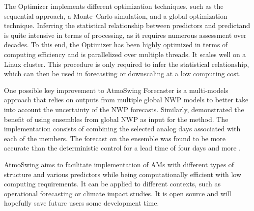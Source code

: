 \documentclass[gmdd]{copernicus}
\begin{document}
The Optimizer implements different optimization techniques, such as the sequential approach, a Monte--Carlo simulation, and a global optimization technique. Inferring the statistical relationship between predictors and predictand is quite intensive in terms of processing, as it requires numerous assessment over decades. To this end, the Optimizer has been highly optimized in terms of computing efficiency and is parallelized over multiple threads. It scales well on a Linux cluster. This procedure is only required to infer the statistical relationship, which can then be used in forecasting or downscaling at a low computing cost. 

One possible key improvement to AtmoSwing Forecaster is a multi-models approach that relies on outputs from multiple global NWP models to better take into account the uncertainty of the NWP forecasts. Similarly, \citet{Thevenot2004} demonstrated the benefit of using ensembles from global NWP as input for the method. The implementation consists of combining the selected analog days associated with each of the members. The forecast on the ensemble was found to be more accurate than the deterministic control for a lead time of four days and more \citep{Thevenot2004}. 

AtmoSwing aims to facilitate implementation of AMs with different types of structure and various predictors while being computationally efficient with low computing requirements. It can be applied to different contexts, such as operational forecasting or climate impact studies. It is open source and will hopefully save future users some development time.



\end{document}
